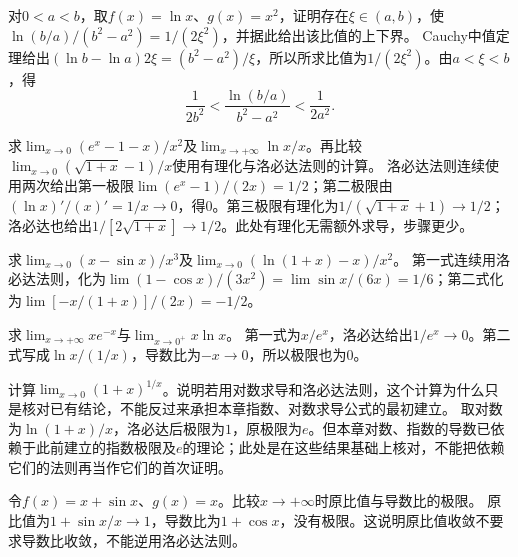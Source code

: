 对\(0<a<b\)，取\(f(x)=\ln x\)、\(g(x)=x^2\)，证明存在\(\xi\in(a,b)\)，使\(\ln(b/a)/(b^2-a^2)=1/(2\xi^2)\)，并据此给出该比值的上下界。
\solutionanswer
Cauchy中值定理给出\((\ln b-\ln a)2\xi=(b^2-a^2)/\xi\)，所以所求比值为\(1/(2\xi^2)\)。由\(a<\xi<b\)，得
\[
 \frac1{2b^2}<\frac{\ln(b/a)}{b^2-a^2}<\frac1{2a^2}.
\]


求\(\lim_{x\to0}(e^x-1-x)/x^2\)及\(\lim_{x\to+\infty}\ln x/x\)。再比较\(\lim_{x\to0}(\sqrt{1+x}-1)/x\)使用有理化与洛必达法则的计算。
\solutionanswer
洛必达法则连续使用两次给出第一极限\(\lim(e^x-1)/(2x)=1/2\)；第二极限由\((\ln x)'/(x)'=1/x\to0\)，得\(0\)。第三极限有理化为\(1/(\sqrt{1+x}+1)\to1/2\)；洛必达也给出\(1/[2\sqrt{1+x}]\to1/2\)。此处有理化无需额外求导，步骤更少。


求\(\lim_{x\to0}(x-\sin x)/x^3\)及\(\lim_{x\to0}(\ln(1+x)-x)/x^2\)。
\solutionanswer
第一式连续用洛必达法则，化为\(\lim(1-\cos x)/(3x^2)=\lim\sin x/(6x)=1/6\)；第二式化为\(\lim[-x/(1+x)]/(2x)=-1/2\)。


求\(\lim_{x\to+\infty}x e^{-x}\)与\(\lim_{x\to0^+}x\ln x\)。
\solutionanswer
第一式为\(x/e^x\)，洛必达给出\(1/e^x\to0\)。第二式写成\(\ln x/(1/x)\)，导数比为\(-x\to0\)，所以极限也为\(0\)。


计算\(\lim_{x\to0}(1+x)^{1/x}\)。说明若用对数求导和洛必达法则，这个计算为什么只是核对已有结论，不能反过来承担本章指数、对数求导公式的最初建立。
\solutionanswer
取对数为\(\ln(1+x)/x\)，洛必达后极限为\(1\)，原极限为\(e\)。但本章对数、指数的导数已依赖于此前建立的指数极限及\(e\)的理论；此处是在这些结果基础上核对，不能把依赖它们的法则再当作它们的首次证明。


令\(f(x)=x+\sin x\)、\(g(x)=x\)。比较\(x\to+\infty\)时原比值与导数比的极限。
\solutionanswer
原比值为\(1+\sin x/x\to1\)，导数比为\(1+\cos x\)，没有极限。这说明原比值收敛不要求导数比收敛，不能逆用洛必达法则。
\par
